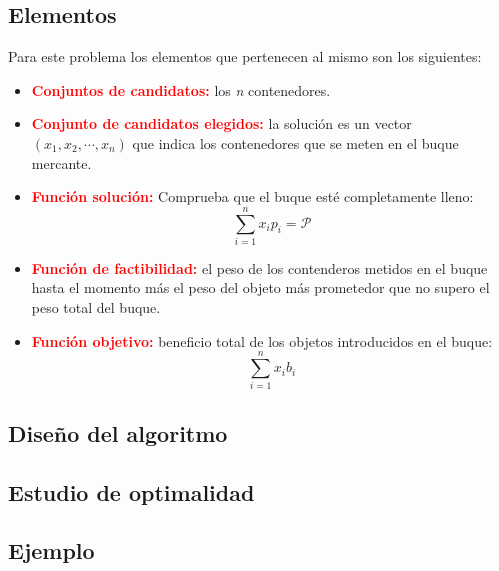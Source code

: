 \subsection{Elementos}

Para este problema los elementos que pertenecen al mismo son los siguientes:

\begin{itemize}[label=\textcolor{red}{\textbullet}]
	\item   \textcolor{red}{\textbf{Conjuntos de candidatos:}} los \textit{n} contenedores.
	\item \textcolor{red}{\textbf{Conjunto de candidatos elegidos:}} la solución es un vector $(x_1, x_2,\cdots , x_n)$ que indica los contenedores que se meten en el buque mercante.
	\item \textcolor{red}{\textbf{Función solución:}} Comprueba que el buque esté completamente lleno:
	      \begin{equation*}
		      \sum_{i = 1}^{n} x_ip_i = \mathcal{P}
	      \end{equation*}
	\item \textcolor{red}{\textbf{Función de factibilidad:}} el peso de los contenderos metidos en el buque hasta el momento más el peso del objeto más prometedor que no supero el peso total del buque.
	\item \textcolor{red}{\textbf{Función objetivo:}} beneficio total de los objetos introducidos en el buque:
	      \begin{equation*}
		      \sum_{i = 1}^{n} x_ib_i
	      \end{equation*}
\end{itemize}

\subsection{Diseño del algoritmo}

\subsection{Estudio de optimalidad}

\subsection{Ejemplo}
